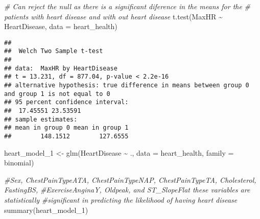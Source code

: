 \documentclass[
]{article}
\newenvironment{Shaded}{\begin{snugshade}}{\end{snugshade}}
\newcommand{\AttributeTok}[1]{\textcolor[rgb]{0.77,0.63,0.00}{#1}}
\newcommand{\CommentTok}[1]{\textcolor[rgb]{0.56,0.35,0.01}{\textit{#1}}}
\newcommand{\FunctionTok}[1]{\textcolor[rgb]{0.00,0.00,0.00}{#1}}
\newcommand{\NormalTok}[1]{#1}
\newcommand{\OtherTok}[1]{\textcolor[rgb]{0.56,0.35,0.01}{#1}}
\newcommand{\SpecialCharTok}[1]{\textcolor[rgb]{0.00,0.00,0.00}{#1}}
\begin{document}
\begin{Shaded}
\begin{Highlighting}[]
\CommentTok{\# Can reject the null as there is a significant diference in the means for the}
\CommentTok{\# patients with heart disease and with out heart disease}
\FunctionTok{t.test}\NormalTok{(MaxHR }\SpecialCharTok{\textasciitilde{}}\NormalTok{ HeartDisease, }\AttributeTok{data =}\NormalTok{ heart\_health)}
\end{Highlighting}
\end{Shaded}

\begin{verbatim}
## 
##  Welch Two Sample t-test
## 
## data:  MaxHR by HeartDisease
## t = 13.231, df = 877.04, p-value < 2.2e-16
## alternative hypothesis: true difference in means between group 0 and group 1 is not equal to 0
## 95 percent confidence interval:
##  17.45551 23.53591
## sample estimates:
## mean in group 0 mean in group 1 
##        148.1512        127.6555
\end{verbatim}

\begin{Shaded}
\begin{Highlighting}[]
\NormalTok{heart\_model\_1 }\OtherTok{\textless{}{-}} \FunctionTok{glm}\NormalTok{(HeartDisease }\SpecialCharTok{\textasciitilde{}}\NormalTok{ ., }\AttributeTok{data =}\NormalTok{ heart\_health, }\AttributeTok{family =}\NormalTok{ binomial)}

\CommentTok{\#Sex, ChestPainTypeATA, ChestPainTypeNAP, ChestPainTypeTA, Cholesterol, FastingBS,}
\CommentTok{\#ExerciseAnginaY, Oldpeak, and ST\_SlopeFlat these variables are statistically }
\CommentTok{\#significant in predicting the likelihood of having heart disease}
\FunctionTok{summary}\NormalTok{(heart\_model\_1)}
\end{Highlighting}
\end{Shaded}
\end{document}
